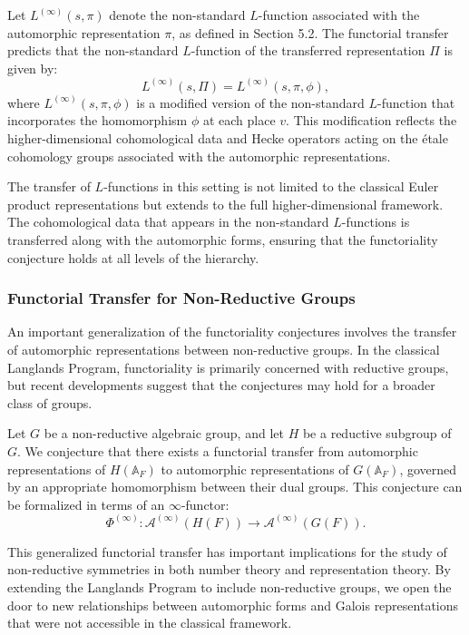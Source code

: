 \documentclass{article}
\theoremstyle{remark}
\begin{document}
Let $L^{(\infty)}(s, \pi)$ denote the non-standard $L$-function associated with the automorphic representation $\pi$, as defined in Section 5.2. The functorial transfer predicts that the non-standard $L$-function of the transferred representation $\Pi$ is given by:
\[
L^{(\infty)}(s, \Pi) = L^{(\infty)}(s, \pi, \phi),
\]
where $L^{(\infty)}(s, \pi, \phi)$ is a modified version of the non-standard $L$-function that incorporates the homomorphism $\phi$ at each place $v$. This modification reflects the higher-dimensional cohomological data and Hecke operators acting on the étale cohomology groups associated with the automorphic representations.

The transfer of $L$-functions in this setting is not limited to the classical Euler product representations but extends to the full higher-dimensional framework. The cohomological data that appears in the non-standard $L$-functions is transferred along with the automorphic forms, ensuring that the functoriality conjecture holds at all levels of the hierarchy.

\subsubsection{Functorial Transfer for Non-Reductive Groups}

An important generalization of the functoriality conjectures involves the transfer of automorphic representations between non-reductive groups. In the classical Langlands Program, functoriality is primarily concerned with reductive groups, but recent developments suggest that the conjectures may hold for a broader class of groups.

Let $G$ be a non-reductive algebraic group, and let $H$ be a reductive subgroup of $G$. We conjecture that there exists a functorial transfer from automorphic representations of $H(\mathbb{A}_F)$ to automorphic representations of $G(\mathbb{A}_F)$, governed by an appropriate homomorphism between their dual groups. This conjecture can be formalized in terms of an $\infty$-functor:
\[
\Phi^{(\infty)}: \mathcal{A}^{(\infty)}(H(F)) \to \mathcal{A}^{(\infty)}(G(F)).
\]

This generalized functorial transfer has important implications for the study of non-reductive symmetries in both number theory and representation theory. By extending the Langlands Program to include non-reductive groups, we open the door to new relationships between automorphic forms and Galois representations that were not accessible in the classical framework.
\end{document}
